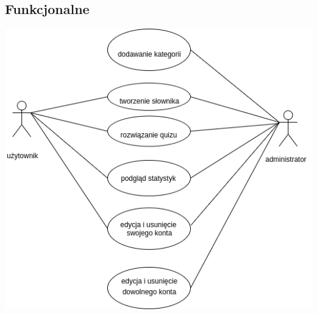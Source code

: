 \documentclass[a4paper,10pt]{article}
\begin{document}
\subsection{Funkcjonalne}
\includegraphics[scale=0.55]{use_cases}
\end{document}
